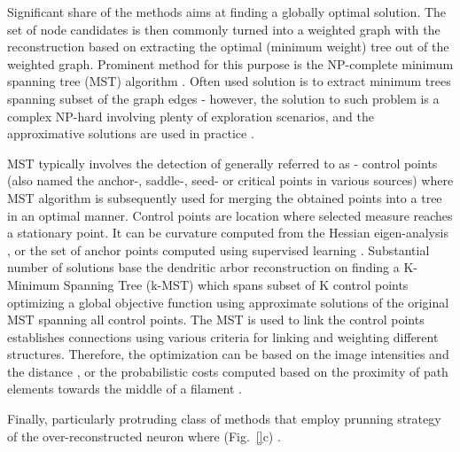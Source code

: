 Significant share of the methods aims at finding a globally optimal solution. The set of node candidates is then commonly turned into a weighted graph with the reconstruction based on extracting the optimal (minimum weight) tree out of the weighted graph. Prominent method for this purpose is the NP-complete minimum spanning tree (MST) algorithm \cite{turetken2011automated,yuan2009mdl,gonzalez2010delineating,xie2010automatic}. Often used solution is to extract minimum trees spanning subset of the graph edges - however, the solution to such problem is a complex NP-hard \cite{chimani2009obtaining} involving plenty of exploration scenarios, and the approximative solutions are used in practice \cite{blum2005combining,gonzalez2010delineating}.


MST typically involves the detection of generally referred to as - control points (also named the anchor-, saddle-, seed- or critical points in various sources) where MST algorithm is subsequently used for merging the obtained points into a tree in an optimal manner. Control points are location where selected measure reaches a stationary point. It can be curvature computed from the Hessian eigen-analysis \cite{yuan2009mdl}, or the set of anchor points computed using supervised learning \cite{turetken2011automated}. Substantial number of solutions \cite{gonzalez2010delineating,xie2010automatic,turetken2011automated} base the dendritic arbor reconstruction on finding a K-Minimum Spanning Tree (k-MST) which spans subset of K control points optimizing a global objective function using approximate solutions of the original MST spanning all control points. The MST is used to link the control points establishes connections using various criteria for linking and weighting different structures. Therefore, the optimization can be based on the image intensities and the distance \cite{yuan2009mdl}, or the probabilistic costs computed based on the proximity of path elements towards the middle of a filament \cite{turetken2011automated}.

Finally, particularly protruding class of methods that employ prunning strategy of the over-reconstructed neuron where  (Fig.~\ref{}c) \cite{peng2011automatic}\cite{xiao2013app2}.

